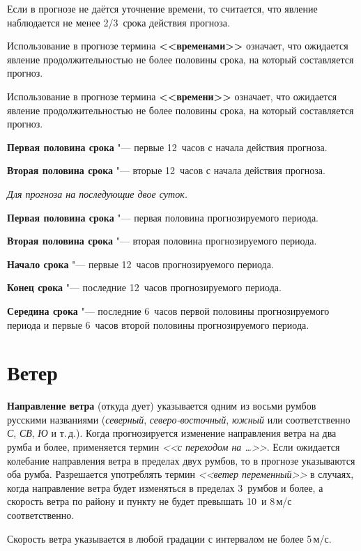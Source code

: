 \documentclass[a4paper, 12pt, twoside, final, book, russian, fittopage, cyremdash, openright]{ncc}
\newcommand{\mps}{\,м/с\xspace}
\begin{document}
Если в прогнозе не даётся уточнение времени, то считается, что явление
наблюдается не менее 2/3~срока действия прогноза.

Использование в прогнозе термина \textbf{<<временами>>} означает, что ожидается
явление продолжительностью не более половины срока, на который
составляется прогноз.

Использование в прогнозе термина \textbf{<<времени>>} означает, что ожидается
явление продолжительностью не более половины срока, на который
составляется прогноз.

\textbf{Первая половина срока} "--- первые 12~часов с начала действия прогноза.

\textbf{Вторая половина срока} "--- вторые 12~часов с начала действия прогноза.

\textit{Для прогноза на последующие двое суток.}

\textbf{Первая половина срока} "--- первая половина прогнозируемого периода.

\textbf{Вторая половина срока} "--- вторая половина прогнозируемого периода.

\textbf{Начало срока} "--- первые 12~часов прогнозируемого периода.

\textbf{Конец срока} "--- последние 12~часов прогнозируемого периода.

\textbf{Середина срока} "--- последние 6~часов первой половины прогнозируемого
периода и первые 6~часов второй половины прогнозируемого периода.

\section{Ветер}
\label{sec:wind_p}

\textbf{Направление ветра} (откуда дует) указывается одним из восьми
румбов русскими названиями (\textit{северный}, \textit{северо-восточный}, \textit{южный} или
соответственно \textit{С}, \textit{СВ}, \textit{Ю} и т.\,д.).
Когда прогнозируется изменение
направления ветра на два румба и более, применяется термин \textit{<<с
переходом на \ldots>>}. Если ожидается колебание направления ветра в
пределах двух румбов, то в прогнозе указываются оба румба. Разрешается
употреблять термин \textit{<<ветер переменный>>} в случаях, когда направление
ветра будет изменяться в пределах 3~румбов и более, а скорость ветра
по району и пункту не будет превышать 10~и 8\mps соответственно.

Скорость ветра указывается в любой градации с интервалом не более 5\mps.
\end{document}
